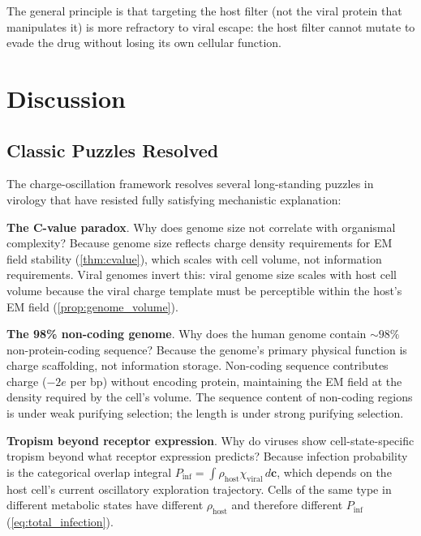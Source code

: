 \documentclass[12pt,a4paper]{article}
\theoremstyle{definition}
\theoremstyle{remark}
\newcommand{\Phost}{\rho_{\mathrm{host}}}
\newcommand{\chiviral}{\chi_{\mathrm{viral}}}
\newcommand{\vv}[1]{\boldsymbol{#1}}
\begin{document}
The general principle is that targeting the host filter (not the viral protein that manipulates it) is more refractory to viral escape: the host filter cannot mutate to evade the drug without losing its own cellular function.

\section{Discussion}
\label{sec:discussion}

\subsection{Classic Puzzles Resolved}

The charge-oscillation framework resolves several long-standing puzzles in virology that have resisted fully satisfying mechanistic explanation:

\textbf{The C-value paradox}. Why does genome size not correlate with organismal complexity? Because genome size reflects charge density requirements for EM field stability (\cref{thm:cvalue}), which scales with cell volume, not information requirements. Viral genomes invert this: viral genome size scales with host cell volume because the viral charge template must be perceptible within the host's EM field (\cref{prop:genome_volume}).

\textbf{The 98\% non-coding genome}. Why does the human genome contain $\sim\!98\%$ non-protein-coding sequence? Because the genome's primary physical function is charge scaffolding, not information storage. Non-coding sequence contributes charge ($-2e$ per bp) without encoding protein, maintaining the EM field at the density required by the cell's volume. The sequence content of non-coding regions is under weak purifying selection; the length is under strong purifying selection.

\textbf{Tropism beyond receptor expression}. Why do viruses show cell-state-specific tropism beyond what receptor expression predicts? Because infection probability is the categorical overlap integral $P_{\mathrm{inf}} = \int \Phost \chiviral\,d\vv{c}$, which depends on the host cell's current oscillatory exploration trajectory. Cells of the same type in different metabolic states have different $\Phost$ and therefore different $P_{\mathrm{inf}}$ (\cref{eq:total_infection}).
\end{document}
